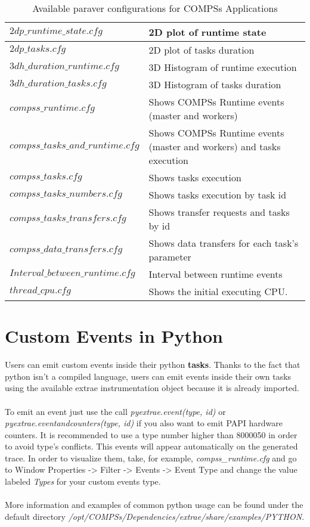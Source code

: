 \bgroup
  \def\arraystretch{1.5}
  \begin{table}[h]
    \begin{center}
      \begin{tabular}{| p{} | p{} |}
	\hline
	$2dp\_runtime\_state.cfg$		& 2D plot of runtime state \\ \hline
	$2dp\_tasks.cfg$			& 2D plot of tasks duration \\ \hline
	$3dh\_duration\_runtime.cfg$		& 3D Histogram of runtime execution \\ \hline
	$3dh\_duration\_tasks.cfg$		& 3D Histogram of tasks duration \\ \hline
	$compss\_runtime.cfg$ 			& Shows COMPSs Runtime events (master and workers) \\ \hline
	$compss\_tasks\_and\_runtime.cfg$ 	& Shows COMPSs Runtime events (master and workers) and tasks execution \\ \hline
	$compss\_tasks.cfg$ 			& Shows tasks execution \\ \hline
	$compss\_tasks\_numbers.cfg$ 		& Shows tasks execution by task id \\ \hline
	$compss\_tasks\_transfers.cfg$ 		& Shows transfer requests and tasks by id \\ \hline
	$compss\_data\_transfers.cfg$ 		& Shows data transfers for each task's parameter \\ \hline
	$Interval\_between\_runtime.cfg$ 	& Interval between runtime events \\ \hline
	$thread\_cpu.cfg$			& Shows the initial executing CPU. \\ \hline
      \end{tabular}
      \caption{Available paraver configurations for COMPSs Applications}
      \label{tab:paraver_configs}
    \end{center}
  \end{table}
\egroup

\section{Custom Events in Python}

Users can emit custom events inside their python \textbf{tasks}. Thanks to the fact that python isn't a compiled language, users can emit events inside their own tasks using the available extrae instrumentation object because it is already imported.
\\
\\
To emit an event just use the call \textit{pyextrae.event(type, id)} or \textit{pyextrae.eventandcounters(type, id)} if you also want to emit PAPI hardware counters. It is recommended to use a type number higher than 8000050 in order to avoid type's conflicts. This events will appear automatically on the generated trace. In order to visualize them, take, for example, \textit{compss\_runtime.cfg} and go to Window Properties -> Filter -> Events -> Event Type and change the value labeled \textit{Types} for your custom events type.
\\
\\
More information and examples of common python usage can be found under the default directory \textit{/opt/COMPSs/Dependencies/extrae/share/examples/PYTHON}.

